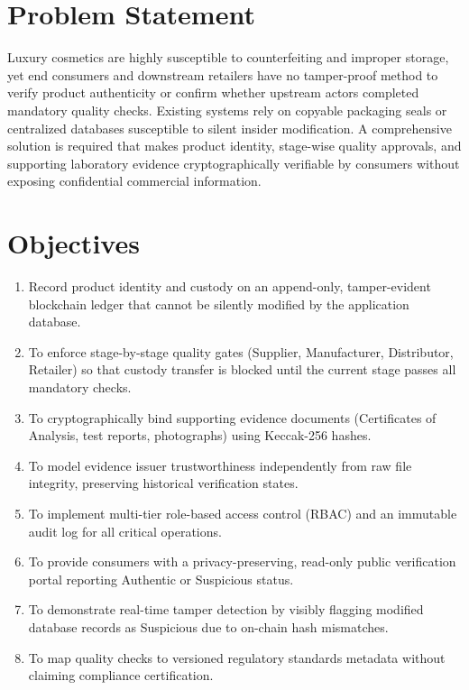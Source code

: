 \documentclass[12pt,a4paper]{report}
\begin{document}
\section{Problem Statement}
Luxury cosmetics are highly susceptible to counterfeiting and improper storage, yet end consumers and downstream retailers have no tamper-proof method to verify product authenticity or confirm whether upstream actors completed mandatory quality checks. Existing systems rely on copyable packaging seals or centralized databases susceptible to silent insider modification. A comprehensive solution is required that makes product identity, stage-wise quality approvals, and supporting laboratory evidence cryptographically verifiable by consumers without exposing confidential commercial information.

\section{Objectives}
\begin{enumerate}[leftmargin=1.8em, itemsep=3pt, parsep=0pt]
    \item Record product identity and custody on an append-only, tamper-evident blockchain ledger that cannot be silently modified by the application database.
    \item To enforce stage-by-stage quality gates (Supplier, Manufacturer, Distributor, Retailer) so that custody transfer is blocked until the current stage passes all mandatory checks.
    \item To cryptographically bind supporting evidence documents (Certificates of Analysis, test reports, photographs) using Keccak-256 hashes.
    \item To model evidence issuer trustworthiness independently from raw file integrity, preserving historical verification states.
    \item To implement multi-tier role-based access control (RBAC) and an immutable audit log for all critical operations.
    \item To provide consumers with a privacy-preserving, read-only public verification portal reporting Authentic or Suspicious status.
    \item To demonstrate real-time tamper detection by visibly flagging modified database records as Suspicious due to on-chain hash mismatches.
    \item To map quality checks to versioned regulatory standards metadata without claiming compliance certification.
\end{enumerate}
\end{document}
